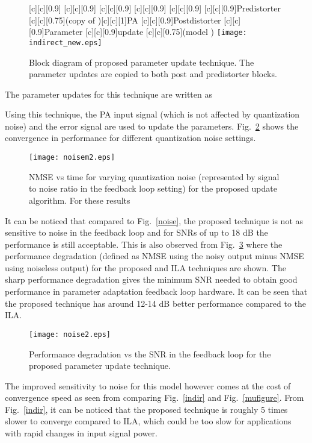 \documentclass[journal]{IEEEtran}
\begin{document}
\begin{figure}
\centering
{}[c][c][0.9]{} [c][c][0.9]{} [c][c][0.9]{} [c][c][0.9]{} [c][c][0.9]{} [c][c][0.9]{Predistorter} [c][c][0.75]{(copy of )}[c][c][1]{PA} [c][c][0.9]{Postdistorter} [c][c][0.9]{Parameter} [c][c][0.9]{update} [c][c][0.75]{(model )} 
\texttt{[image: indirect\_new.eps]}
\caption{Block diagram of proposed parameter update technique. The parameter updates are copied to both post and predistorter blocks.} \label{adaptnew}
\end{figure}


The parameter updates for this technique are written as



Using this technique, the PA input signal  (which is not affected by quantization noise) and the error signal are used to update the parameters. Fig.~\ref{noise2m} shows the convergence in performance for different quantization noise settings.

\begin{figure}
\centering
\texttt{[image: noisem2.eps]}
\caption{NMSE vs time for varying quantization noise (represented by signal to noise ratio in the feedback loop setting) for the proposed update algorithm. For these results } \label{noise2m}
\end{figure}
It can be noticed that compared to Fig.~\ref{noise}, the proposed technique is not as sensitive to noise in the feedback loop and for SNRs of up to 18 dB the performance is still acceptable. This is also observed from Fig.~\ref{noise2} where the performance degradation (defined as NMSE using the noisy output minus NMSE using noiseless output) for the proposed and ILA techniques are shown. The sharp performance degradation gives the minimum SNR needed to obtain good performance in parameter adaptation feedback loop hardware. It can be seen that the proposed technique has around 12-14 dB better performance compared to the ILA.

\begin{figure}
\centering
\texttt{[image: noise2.eps]}
\caption{Performance degradation vs the SNR in the feedback loop for the proposed parameter update technique.} \label{noise2}
\end{figure}

The improved sensitivity to noise for this model however comes at the cost of convergence speed as seen from comparing  Fig.~\ref{indir} and Fig.~\ref{mufigure}. From Fig.~\ref{indir}, it can be noticed that the proposed technique is roughly 5 times slower to converge compared to ILA, which could be too slow for applications with rapid changes in input signal power.
\end{document}
